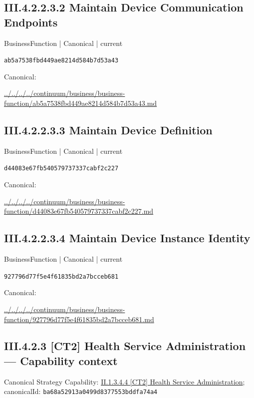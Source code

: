 \documentclass[10pt,a4paper]{article}
\begin{document}
\subsection*{III.4.2.2.3.2 Maintain Device Communication Endpoints}
\label{element-ab5a7538fbd449ae8214d584b7d53a43}
{\small BusinessFunction | Canonical | current}\par
\texttt{ab5a7538fbd449ae8214d584b7d53a43}\par
Canonical: \par
{\footnotesize\url{../../../../continuum/business/business-function/ab5a7538fbd449ae8214d584b7d53a43.md}}\par
\subsection*{III.4.2.2.3.3 Maintain Device Definition}
\label{element-d44083e67fb540579737337cabf2c227}
{\small BusinessFunction | Canonical | current}\par
\texttt{d44083e67fb540579737337cabf2c227}\par
Canonical: \par
{\footnotesize\url{../../../../continuum/business/business-function/d44083e67fb540579737337cabf2c227.md}}\par
\subsection*{III.4.2.2.3.4 Maintain Device Instance Identity}
\label{element-927796d77f5e4f61835bd2a7bcceb681}
{\small BusinessFunction | Canonical | current}\par
\texttt{927796d77f5e4f61835bd2a7bcceb681}\par
Canonical: \par
{\footnotesize\url{../../../../continuum/business/business-function/927796d77f5e4f61835bd2a7bcceb681.md}}\par
\subsection*{III.4.2.3 [CT2] Health Service Administration — Capability context}
Canonical Strategy Capability: \hyperref[element-ba68a52913a0499d8377553bddfa74a4]{II.1.3.4.4 [CT2] Health Service Administration}; canonicalId: \texttt{ba68a52913a0499d8377553bddfa74a4}\par
\end{document}
